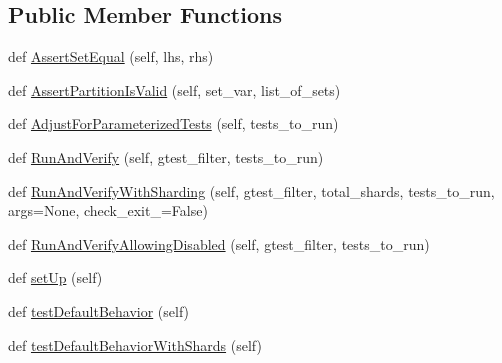 \subsection*{Public Member Functions}
\begin{DoxyCompactItemize}
\item 
def \hyperlink{classtests_1_1libs_1_1googletest-master_1_1googletest_1_1test_1_1googletest-filter-unittest_1_1GTestFilterUnitTest_a79b8261a1b15963b9d3b61f4e995fc88}{Assert\+Set\+Equal} (self, lhs, rhs)
\item 
def \hyperlink{classtests_1_1libs_1_1googletest-master_1_1googletest_1_1test_1_1googletest-filter-unittest_1_1GTestFilterUnitTest_a2c7340874da6ead9ada1b91067d49b99}{Assert\+Partition\+Is\+Valid} (self, set\+\_\+var, list\+\_\+of\+\_\+sets)
\item 
def \hyperlink{classtests_1_1libs_1_1googletest-master_1_1googletest_1_1test_1_1googletest-filter-unittest_1_1GTestFilterUnitTest_ad46d59c2f4e65b25a69c4a4bb5d0dd82}{Adjust\+For\+Parameterized\+Tests} (self, tests\+\_\+to\+\_\+run)
\item 
def \hyperlink{classtests_1_1libs_1_1googletest-master_1_1googletest_1_1test_1_1googletest-filter-unittest_1_1GTestFilterUnitTest_a1b6ee657f8c77b096e243b7592ac8914}{Run\+And\+Verify} (self, gtest\+\_\+filter, tests\+\_\+to\+\_\+run)
\item 
def \hyperlink{classtests_1_1libs_1_1googletest-master_1_1googletest_1_1test_1_1googletest-filter-unittest_1_1GTestFilterUnitTest_a7dc909419d67e1bfb4b4712026bd87f4}{Run\+And\+Verify\+With\+Sharding} (self, gtest\+\_\+filter, total\+\_\+shards, tests\+\_\+to\+\_\+run, args=None, check\+\_\+exit\+\_=False)
\item 
def \hyperlink{classtests_1_1libs_1_1googletest-master_1_1googletest_1_1test_1_1googletest-filter-unittest_1_1GTestFilterUnitTest_a45e7e0f33d20ba4b905947eb1e2f084c}{Run\+And\+Verify\+Allowing\+Disabled} (self, gtest\+\_\+filter, tests\+\_\+to\+\_\+run)
\item 
def \hyperlink{classtests_1_1libs_1_1googletest-master_1_1googletest_1_1test_1_1googletest-filter-unittest_1_1GTestFilterUnitTest_a298b2fdd3d7c6ead66337f42c69790a9}{set\+Up} (self)
\item 
def \hyperlink{classtests_1_1libs_1_1googletest-master_1_1googletest_1_1test_1_1googletest-filter-unittest_1_1GTestFilterUnitTest_a4e90be61ef5c89cf533dd602f4a8aafe}{test\+Default\+Behavior} (self)
\item 
def \hyperlink{classtests_1_1libs_1_1googletest-master_1_1googletest_1_1test_1_1googletest-filter-unittest_1_1GTestFilterUnitTest_ad02f9f192a8204eced1b74a4e225c553}{test\+Default\+Behavior\+With\+Shards} (self)

\end{DoxyCompactItemize}
